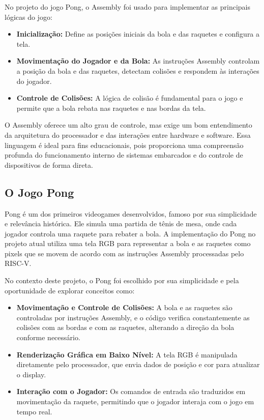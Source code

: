 \documentclass[english, spanish,brazilian]{RBIEarticle} %
\begin{document}
\begin{itemize}
No projeto do jogo Pong, o Assembly foi usado para implementar as principais lógicas do jogo:
\begin{itemize}
    \item \textbf{Inicialização:} Define as posições iniciais da bola e das raquetes e configura a tela.
    \item \textbf{Movimentação do Jogador e da Bola:} As instruções Assembly controlam a posição da bola e das raquetes, detectam colisões e respondem às interações do jogador.
    \item \textbf{Controle de Colisões:} A lógica de colisão é fundamental para o jogo e permite que a bola rebata nas raquetes e nas bordas da tela.
\end{itemize}

O Assembly oferece um alto grau de controle, mas exige um bom entendimento da arquitetura do processador e das interações entre hardware e software. Essa linguagem é ideal para fins educacionais, pois proporciona uma compreensão profunda do funcionamento interno de sistemas embarcados e do controle de dispositivos de forma direta.

\subsection{O Jogo Pong}

Pong é um dos primeiros videogames desenvolvidos, famoso por sua simplicidade e relevância histórica. Ele simula uma partida de tênis de mesa, onde cada jogador controla uma raquete para rebater a bola. A implementação do Pong no projeto atual utiliza uma tela RGB para representar a bola e as raquetes como pixels que se movem de acordo com as instruções Assembly processadas pelo RISC-V.

No contexto deste projeto, o Pong foi escolhido por sua simplicidade e pela oportunidade de explorar conceitos como:
\begin{itemize}
    \item \textbf{Movimentação e Controle de Colisões:} A bola e as raquetes são controladas por instruções Assembly, e o código verifica constantemente as colisões com as bordas e com as raquetes, alterando a direção da bola conforme necessário.
    \item \textbf{Renderização Gráfica em Baixo Nível:} A tela RGB é manipulada diretamente pelo processador, que envia dados de posição e cor para atualizar o display.
    \item \textbf{Interação com o Jogador:} Os comandos de entrada são traduzidos em movimentação da raquete, permitindo que o jogador interaja com o jogo em tempo real.
\end{itemize}


\end{itemize}
\end{document}
